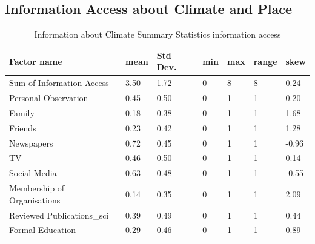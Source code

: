 \subsection{Information Access about Climate and Place}

\begin{center}
\begin{table}[h]
    \centering
    \begin{tabular}{|l|l|l|l|l|l|l|}
    \hline
        Factor name & mean & Std Dev. & min & max & range & skew  \\ \hline
        
      Sum of Information Access & 3.50 & 1.72 & 0 & 8 & 8 & 0.24  \\ \hline
        Personal Observation  & 0.45 & 0.50 & 0 & 1 & 1 & 0.20 \\ \hline
        Family & 0.18 & 0.38 & 0 & 1 & 1 & 1.68  \\ \hline
        Friends & 0.23 & 0.42 & 0 & 1 & 1 & 1.28  \\ \hline
        Newspapers & 0.72 & 0.45 & 0 & 1 & 1 & -0.96 \\ \hline
        TV & 0.46 & 0.50 & 0 & 1 & 1 & 0.14 \\ \hline
        Social Media & 0.63 & 0.48 & 0 & 1 & 1 & -0.55 \\ \hline
        Membership of Organisations & 0.14 & 0.35 & 0 & 1 & 1 & 2.09 \\ \hline
        Reviewed Publications\_sci & 0.39 & 0.49 & 0 & 1 & 1 & 0.44 \\ \hline
        Formal Education & 0.29 & 0.46 & 0 & 1 & 1 & 0.89 \\ \hline
        
         \end{tabular}
    \caption{Information about Climate Summary Statistics information access}
\label{table:summary_stats_info_access}
\end{table}
\end{center}

